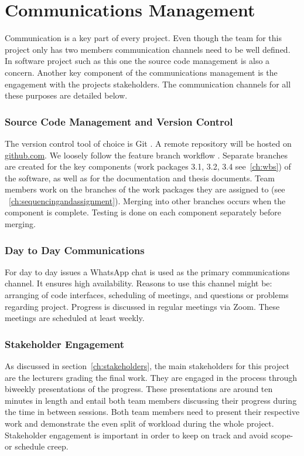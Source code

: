 \section{Communications Management}
\label{ch:communicationsmanagement}
Communication is a key part of every project. Even though the team for this project only has two members communication channels need to be well defined. In software project such as this one the source code management is also a concern. Another key component of the communications management is the engagement with the projects stakeholders. The communication channels for all these purposes are detailed below.

\subsubsection{Source Code Management and Version Control}
\label{ch:versioncontrol}
The version control tool of choice is Git \cite{git}. A remote repository will be hosted on \url{github.com}. We loosely follow the feature branch workflow \cite{featurebranch}. Separate branches are created for the key components (work packages 3.1, 3.2, 3.4 see~\ref{ch:wbs}) of the software, as well as for the documentation and thesis documents. Team members work on the branches of the work packages they are assigned to (see ~\ref{ch:sequencingandassignment}). Merging into other branches occurs when the component is complete. Testing is done on each component separately before merging.


\subsubsection{Day to Day Communications}
\label{ch:daytodaycomms}
For day to day issues a WhatsApp chat is used as the primary communications channel. It ensures high availability. Reasons to use this channel might be: arranging of code interfaces, scheduling of meetings, and questions or problems regarding project. Progress is discussed in regular meetings via Zoom. These meetings are scheduled at least weekly.


\subsubsection{Stakeholder Engagement}
\label{ch:stakeholerengagement}
As discussed in section~\ref{ch:stakeholders}, the main stakeholders for this project are the lecturers grading the final work. They are engaged in the process through biweekly presentations of the progress. These presentations are around ten minutes in length and entail both team members discussing their progress during the time in between sessions. Both team members need to present their respective work and demonstrate the even split of workload during the whole project. Stakeholder engagement is important in order to keep on track and avoid scope- or schedule creep.


